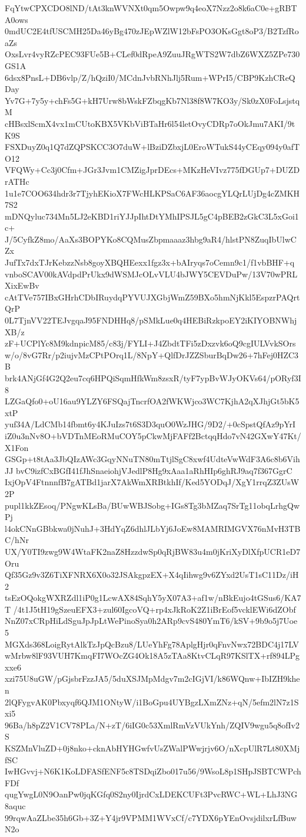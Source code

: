 FqYtwCPXCDO8lND/tAt3knWVNXt0qm5Owpw9q4eoX7Nzz2o8k6aC0e+gRBTA0ows
0mdUC2E4tfUSCMH25Da46yBg470zJEpWZlW12bFsPO3OKsGgt8oP3/B2TzfRoaZs
OxsLvr4vyRZcPEC93FUe5B+CLef0dRpeA9ZuuJRgWTS2W7dbZ6WXZ5ZPe730GS1A
6dsx8PnsL+DB6vlp/Z/hQziI0/MCdnJvbRNhJlj5Rum+WPrI5/CBP9KzhCReQDay
Yv7G+7y5y+chFs5G+kH7Urw8bWskFZbqgKb7Nl38f8W7KO3y/Sk0zX0FoLsjstqM
cHBsxlScmX4vx1mCUtoKBX5VKbViBTaHr6l54letOvyCDRp7oOkJmu7AKI/9tK9S
FSXDuyZ0q1Q7dZQPSKCC3O7duW+lBziDZbxjL0EroWTukS44yCEqy094y0afTO12
VFQWy+Cc3j0Cfm+JGr3Jvm1CMZigJprDEcs+MKzHeVIvz775fDGUp7+DUZDrATHc
1u1e7COO634hdr3r7TjyhEKioX7FWcHLKPSaC6AF36aocgYLQrLUjDg4cZMKH7S2
mDNQyluc734Mn5LJ2eKBD1riYJJpIhtDtYMhIPSJL5gC4pBEB2zGkC3L5xGoi1c+
J/5CyfkZ8mo/AaXs3BOPYKo8CQMusZbpmaaaz3hbg9aR4/hlstPN8ZuqIbUlwCZx
JufTx7dxTJrKebzzNsb8goyXBQHEexx1fgz3x+bAIryqs7oCemn9c1/f1vbBHF+q
vnboSCAV00kAVdpdPrUkx9dWSMJcOLvVLU4bJWY5CEVDuPw/13V70wPRLXixEwBv
cAtTVe757IBxGHrhCDbIRuydqPYVUJXGbjWmZ59BXo5hmNjKkl5EspzrPAQrtQrP
0L7TjnVV22TEJvgqaJ95FNDHHq8/pSMkLue0q4HEBiRzkpoEY2iKIYOBNWhjXB/z
zF+UCPlYc8M9kdnpicM85/c83j/FYLI+J4ZbdtTFi5zDxzvk6oQ9cgIULVvkSOrs
w/o/8vG7Rr/p2iujvMzCPtPOrq1L/8NpY+QlfDrJZZSburBqDw26+7hFej0HZC3B
brk4ANjGf4G2Q2eu7cq6HPQiSqmHfkWm8zsxR/tyF7ypBvWJyOKVs64/pORyf3I8
LZGaQfo0+oU16au9YLZY6FSQajTncrfOA2fWKWjco3WC7KjhA2qXJhjGt5bK5xtP
yuf34A/LdCMb14fbmt6y4KJuIzs7t6S3D3quO0WzJHG/9D2/+0cSpstQfAz9pYrI
iZ0u3nNv8O+bVDTnMEoRMuCOY5pCkwMjFAFf2BctqqHdo7vN42GXwY47Kt/X1Fon
GSGp+t8tAa3JbQIzAWc3GqyNNuTN80mTtjlSgC8xwf4UdteVwWdF3A6c8b6VihJJ
bvC9izfCxBGfI41fJhSnaeiohjVJedlP8Hg9xAaa1aRhHIp6ghRJ9aq7f367GgrC
IxjOpV4FtnnnfB7gATBd1jarX7AkWmXRBtkhIf/Ked5YODqJ/XgY1rrqZ3ZUsW2P
pupl1kkZEsoq/PNgwKLsBa/BUwWBJSobg+IGs8Tg3bMZaq7SrTg11obqLrhgQwPj
l4okCNnGBbkwa0jNuhJ+3HdYqZ6dhlJLbYj6JoEw8MAMRIMGVX76nMvH3TBC/hNr
UX/Y0TI9zwg9W4WtaFK2naZ8HzzdwSp0qRjBW83u4m0jKriXyDlXfpUCR1eD7Oru
Qf35Gz9v3Z6TiXFNRX6X0o32JSAkgpzEX+X4qIihwg9v6ZYxd2UsT1sC11Dz/iH2
tsEzOQokgWXRZdl1iP0g1LcwAX84SqhY5yX07A3+af1w/nBkEujo4tGSus6/KA7T
/4t1J5tH19gSzeuEFX3+zul60IgcoVQ+rp4xJkRoK2Z1iBrEof5vcklEWi6dZObf
NnZ07xCRpHiLdSguJpJpLtWePinoSya0h2ARp9cvS480YmT6/kSV+9b9o5j7Uoe5
MGXds368LoigRytAlkTzJpQcBzu8/LUeYhFg78AplgHjr0qFnvNwx72BDC4j17LV
wMrbw8lF93VUH7KmqFI7WOcZG4Ok18A5zTAa8KtvCLqR97KSlTX+rf894LPgxxe6
xzi75U8uGW/pGjsbrFzzJA5/5duXSJMpMdgv7m2cIGjVI/k86WQnw+IbIZH9khen
2lQFygvAK0Pbxyqf6QJM1ONtyW/i1BoGpu4UYBgzLXmZNz+qN/5efm2lN7z1Sxi5
96Ba/h8pZ2V1CV78PLa/N+zT/6iIG0c53XmlRmVzVUkYnh/ZQIV9wgu5q8ofIv2S
KSZMnVluZD+0j8nko+cknAbHYHGwfvUsZWalPWwjrjv6O/nXcpUlR7Lt80XMjfSC
IwHGvvj+N6K1KoLDFASfENF5c8TSDqiZbo017u56/9WsoL8p1SHpJSBTCWPchFDf
qugYwgL0N9OanPw0jqKGfq0S2ny0IjrdCxLDEKCUFt3PvcRWC+WL+LhJ3NG8aquc
99rqwAaZLbe35h6Gb+3Z+Y4jr9VPMM1WVxCf/c7YDX6pYEnOvsjdilxrLfBuwN2o
